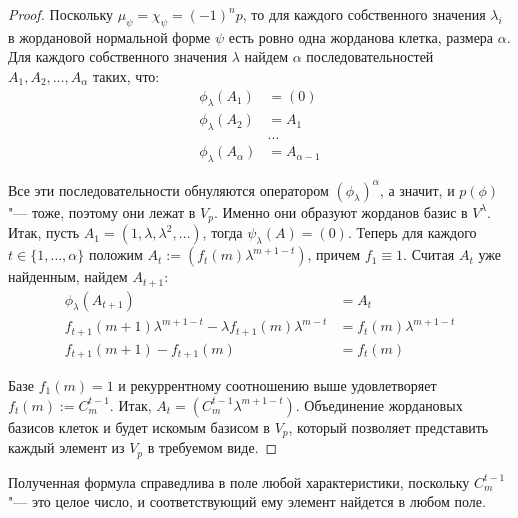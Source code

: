 \begin{proof}
	Поскольку $\mu_\psi = \chi_\psi = (-1)^np$, то для каждого собственного значения $\lambda_i$ в жордановой нормальной форме $\psi$ есть ровно одна жорданова клетка, размера $\alpha$. Для каждого собственного значения $\lambda$ найдем $\alpha$ последовательностей $A_1, A_2, \dots, A_\alpha$ таких, что:
	\begin{align*}
		\phi_\lambda(A_1) &= (0)\\
		\phi_\lambda(A_2) &= A_1\\
		&\dotsc\\
		\phi_\lambda(A_{\alpha}) &=  A_{\alpha - 1}
	\end{align*}
	
	Все эти последовательности обнуляются оператором $(\phi_\lambda)^\alpha$, а значит, и $p(\phi)$ "--- тоже, поэтому они лежат в $V_p$. Именно они образуют жорданов базис в $V^\lambda$. Итак, пусть $A_1 = (1, \lambda, \lambda^2, \dots)$, тогда $\psi_\lambda(A) = (0)$. Теперь для каждого $t \in \{1, \dots, \alpha\}$ положим $A_t := \left(f_t(m)\lambda^{m + 1 - t}\right)$, причем $f_1 \equiv 1$. Считая $A_t$ уже найденным, найдем $A_{t + 1}$:
	\begin{align*}
		\phi_\lambda(A_{t + 1}) &= A_t\\
		f_{t + 1}(m + 1)\lambda^{m + 1 - t} - \lambda f_{t + 1}(m)\lambda^{m - t} &= f_t(m)\lambda^{m + 1 - t}\\
		f_{t + 1}(m + 1) - f_{t + 1}(m) &= f_t(m)
	\end{align*}
	
	Базе $f_1(m) = 1$ и рекуррентному соотношению выше удовлетворяет $f_t(m) := C_{m}^{t - 1}$. Итак, $A_t = (C_m^{t - 1}\lambda^{m + 1 - t})$. Объединение жордановых базисов клеток и будет искомым базисом в $V_p$, который позволяет представить каждый элемент из $V_p$ в требуемом виде.
\end{proof}

\begin{note}
	Полученная формула справедлива в поле любой характеристики, поскольку $C_m^{t - 1}$ "--- это целое число, и соответствующий ему элемент найдется в любом поле.
\end{note}